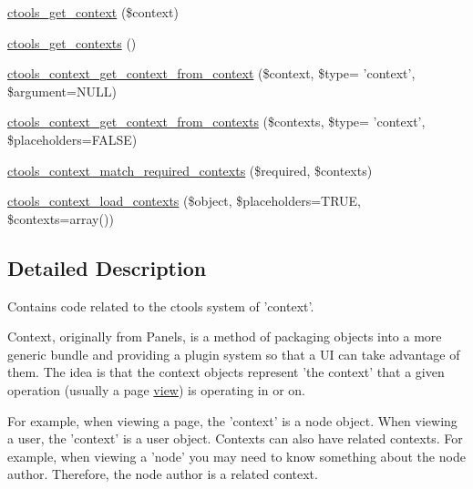 \begin{DoxyCompactItemize}
\item 
\hyperlink{context_8inc_a921be4a2425a4ccdbd236f4f7c18fd41}{ctools\_\-get\_\-context} (\$context)
\item 
\hyperlink{context_8inc_a7fc01c6d2b4a8e5d734a71a824346f21}{ctools\_\-get\_\-contexts} ()
\item 
\hyperlink{context_8inc_a320bbcf9d3bfbdded99116ceab3feb57}{ctools\_\-context\_\-get\_\-context\_\-from\_\-context} (\$context, \$type= 'context', \$argument=NULL)
\item 
\hyperlink{context_8inc_ad0282216d1c9d6bb8d941c6f32a1e2ef}{ctools\_\-context\_\-get\_\-context\_\-from\_\-contexts} (\$contexts, \$type= 'context', \$placeholders=FALSE)
\item 
\hyperlink{context_8inc_a1b7e066112a4bc88f38d407e1656f63e}{ctools\_\-context\_\-match\_\-required\_\-contexts} (\$required, \$contexts)
\item 
\hyperlink{context_8inc_a390479c5cf52f6391de6bca71efe44df}{ctools\_\-context\_\-load\_\-contexts} (\$object, \$placeholders=TRUE, \$contexts=array())
\end{DoxyCompactItemize}


\subsection{Detailed Description}
Contains code related to the ctools system of 'context'.

Context, originally from Panels, is a method of packaging objects into a more generic bundle and providing a plugin system so that a UI can take advantage of them. The idea is that the context objects represent 'the context' that a given operation (usually a page \hyperlink{classview}{view}) is operating in or on.

For example, when viewing a page, the 'context' is a node object. When viewing a user, the 'context' is a user object. Contexts can also have related contexts. For example, when viewing a 'node' you may need to know something about the node author. Therefore, the node author is a related context. 

